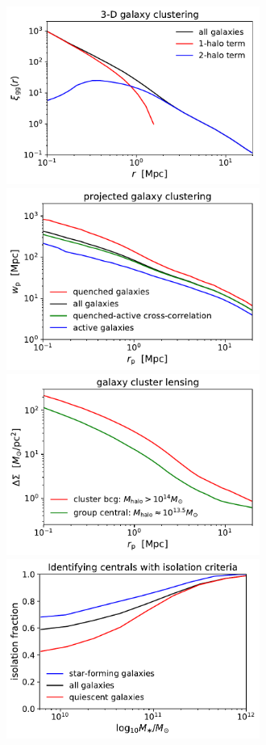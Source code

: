 \documentclass[twocolumn, tighten]{aastex6}
\begin{document}
\begin{figure}
\begin{center}
\includegraphics[width=8.3cm]{./FIGS/tpcf_galaxies.pdf}
\includegraphics[width=8.3cm]{./FIGS/wp_galaxies.pdf}
\includegraphics[width=8.3cm]{./FIGS/galaxy_cluster_lensing.pdf}
\includegraphics[width=8.3cm]{./FIGS/isolation_fraction.pdf}

\end{center}
\end{figure}
\end{document}
